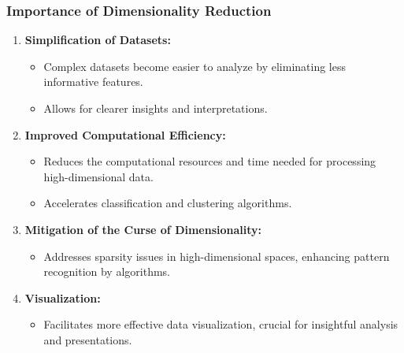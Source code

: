 \documentclass[aspectratio=169]{beamer}
\begin{document}
\begin{frame}[fragile]
    \frametitle{Importance of Dimensionality Reduction}
    \begin{enumerate}
        \item \textbf{Simplification of Datasets:}
        \begin{itemize}
            \item Complex datasets become easier to analyze by eliminating less informative features.
            \item Allows for clearer insights and interpretations.
        \end{itemize}
        
        \item \textbf{Improved Computational Efficiency:}
        \begin{itemize}
            \item Reduces the computational resources and time needed for processing high-dimensional data.
            \item Accelerates classification and clustering algorithms.
        \end{itemize}
        
        \item \textbf{Mitigation of the Curse of Dimensionality:}
        \begin{itemize}
            \item Addresses sparsity issues in high-dimensional spaces, enhancing pattern recognition by algorithms.
        \end{itemize}
        
        \item \textbf{Visualization:}
        \begin{itemize}
            \item Facilitates more effective data visualization, crucial for insightful analysis and presentations.
        \end{itemize}
    \end{enumerate}
\end{frame}
\end{document}
